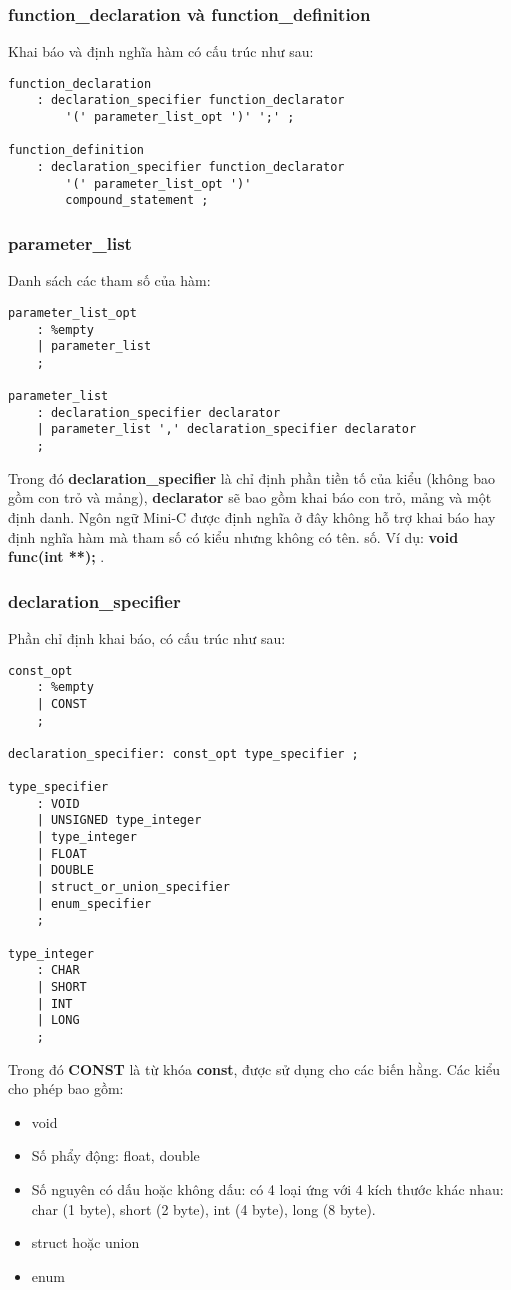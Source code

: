 \documentclass[../report.tex]{subfiles}
\begin{document}
\subsubsection{function\_declaration và function\_definition}
Khai báo và định nghĩa hàm có cấu trúc như sau: 
\begin{lstlisting}
function_declaration 
    : declaration_specifier function_declarator 
        '(' parameter_list_opt ')' ';' ;

function_definition
    : declaration_specifier function_declarator 
        '(' parameter_list_opt ')' 
        compound_statement ;
\end{lstlisting}

\subsubsection{parameter\_list}
Danh sách các tham số của hàm: 
\begin{lstlisting}
parameter_list_opt
    : %empty
    | parameter_list
    ;

parameter_list
    : declaration_specifier declarator 
    | parameter_list ',' declaration_specifier declarator
    ;
\end{lstlisting}
Trong đó \textbf{declaration\_specifier} là chỉ định 
phần tiền tố của kiểu (không bao gồm con trỏ và mảng), 
\textbf{declarator} sẽ bao gồm khai báo con trỏ, 
mảng và một định danh. Ngôn ngữ Mini-C được định nghĩa ở đây không 
hỗ trợ khai báo hay định nghĩa hàm mà 
tham số có kiểu nhưng không có tên.
số. Ví dụ: \textbf{void func(int **); }. \\

\subsubsection{declaration\_specifier}
Phần chỉ định khai báo, có cấu trúc như sau: 
\begin{lstlisting}
const_opt
    : %empty
    | CONST
    ;

declaration_specifier: const_opt type_specifier ;

type_specifier
    : VOID
    | UNSIGNED type_integer
    | type_integer
    | FLOAT 
    | DOUBLE
    | struct_or_union_specifier
    | enum_specifier
    ;

type_integer
    : CHAR
    | SHORT
    | INT
    | LONG
    ;
\end{lstlisting}
Trong đó \textbf{CONST} là từ khóa \textbf{const}, được sử dụng 
cho các biến hằng. Các kiểu cho phép bao gồm: 
\begin{itemize}
\item void
\item Số phẩy động: float, double
\item Số nguyên có dấu hoặc không dấu: 
    có 4 loại ứng với 4 kích thước
    khác nhau: char (1 byte), short (2 byte), 
    int (4 byte), long (8 byte). 
\item struct hoặc union
\item enum 
\end{itemize}
\end{document}
